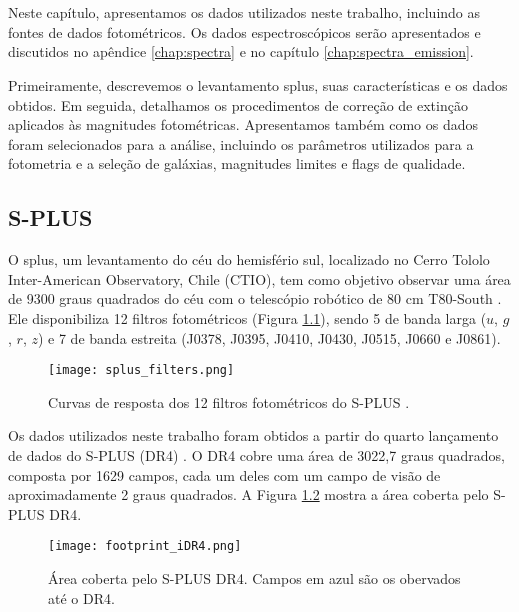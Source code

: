 \chapter{\chapternamedatabase}\label{cap:database}

Neste capítulo, apresentamos os dados utilizados neste trabalho, incluindo as fontes de dados fotométricos. Os dados espectroscópicos serão apresentados e discutidos no apêndice \ref{chap:spectra} e no capítulo \ref{chap:spectra_emission}. 

Primeiramente, descrevemos o levantamento \ac{splus}, suas características e os dados obtidos. Em seguida, detalhamos os procedimentos de correção de extinção aplicados às magnitudes fotométricas. Apresentamos também como os dados foram selecionados para a análise, incluindo os parâmetros utilizados para a fotometria e a seleção de galáxias, magnitudes limites e flags de qualidade.

\section{S-PLUS}
O \ac{splus}, um levantamento do céu do hemisfério sul, localizado no Cerro Tololo Inter-American Observatory, Chile (CTIO), tem como objetivo observar uma área de 9300 graus quadrados do céu com o telescópio robótico de 80 cm T80-South \citep{oliveira2019splus}. Ele disponibiliza 12 filtros fotométricos (Figura \ref{splus_filters}), sendo 5 de banda larga ($u$, $g$, $r$, $z$) e 7 de banda estreita (J0378, J0395, J0410, J0430, J0515, J0660 e J0861).

\begin{figure}[!ht]
    \begin{center}
    \texttt{[image: splus\_filters.png]}
    \caption[]{Curvas de resposta dos 12 filtros fotométricos do S-PLUS \citep{splus_DR4_footprint}.}
    \label{splus_filters}
    \end{center}
\end{figure}

Os dados utilizados neste trabalho foram obtidos a partir do quarto lançamento de dados do S-PLUS (\ac{DR4}) \citep{herpich2024fourthsplusdatarelease}. O DR4 cobre uma área de 3022,7 graus quadrados, composta por 1629 campos, cada um deles com um campo de visão de aproximadamente 2 graus quadrados. A Figura \ref{footprint_iDR4} mostra a área coberta pelo S-PLUS \ac{DR4}.

\begin{figure}[!ht]
    \begin{center}
    \texttt{[image: footprint\_iDR4.png]}
    \caption[]{Área coberta pelo S-PLUS DR4. Campos em azul são os obervados até o DR4.}
    \label{footprint_iDR4}
    \end{center}
\end{figure}

